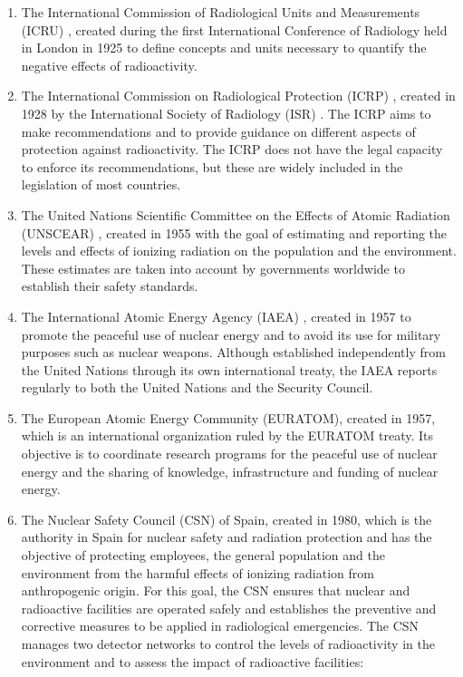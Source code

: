 \begin{enumerate}
\item{} The International Commission of Radiological Units and Measurements (ICRU) \cite{ICRU}, created during the first International Conference of Radiology held in London in 1925 to define concepts and units necessary to quantify the negative effects of radioactivity.

\item{} The International Commission on Radiological Protection (ICRP) \cite{ICRP}, created in 1928 by the International Society of Radiology (ISR) \cite{ISR}. The ICRP aims to make recommendations and to provide guidance on different aspects of protection against radioactivity. The ICRP does not have the legal capacity to enforce its recommendations, but these are widely included in the legislation of most countries. %

\item{} The United Nations Scientific Committee on the Effects of Atomic Radiation (UNSCEAR) \cite{UNSCEAR}, created in 1955 with the goal of estimating and reporting the levels and effects of ionizing radiation on the population and the environment. These estimates are taken into account by governments worldwide to establish their safety standards.

\item{} The International Atomic Energy Agency (IAEA) \cite{IAEA}, created in 1957 to promote the peaceful use of nuclear energy and to avoid its use for military purposes such as nuclear weapons. Although established independently from the United Nations through its own international treaty, the IAEA reports regularly to both the United Nations and the Security Council.

\item{} The European Atomic Energy Community (EURATOM), created in 1957, which is an international organization ruled by the EURATOM treaty. Its objective is to coordinate research programs for the peaceful use of nuclear energy and the sharing of knowledge, infrastructure and funding of nuclear energy.

\item{} The Nuclear Safety Council (CSN) \cite{CSN} of Spain, created in 1980, which is the authority in Spain for nuclear safety and radiation protection and has the objective of protecting employees, the general population and the environment from the harmful effects of ionizing radiation from anthropogenic origin. For this goal, the CSN ensures that nuclear and radioactive facilities are operated safely and establishes the preventive and corrective measures to be applied in radiological emergencies. The CSN manages two detector networks to control the levels of radioactivity in the environment and to assess the impact of radioactive facilities:


\end{enumerate}
